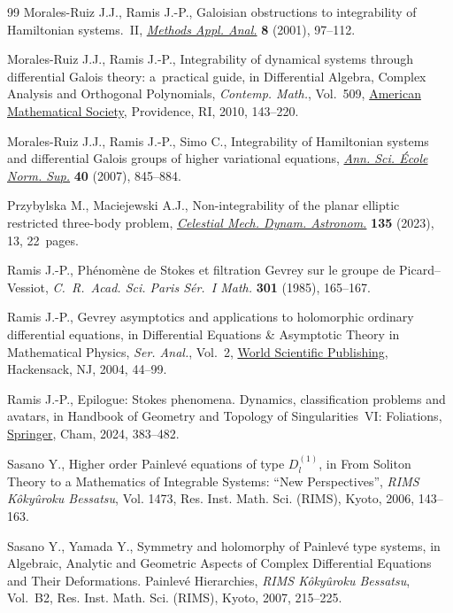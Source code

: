 \documentclass[pdftex]{sigma}
\numberwithin{equation}{section}
\begin{document}
\begin{thebibliography}{99}
Morales-Ruiz J.J., Ramis J.-P., Galoisian obstructions to integrability of
 {H}amiltonian systems.~{II}, \href{https://doi.org/10.4310/MAA.2001.v8.n1.a4}{\textit{Methods Appl. Anal.}} \textbf{8} (2001),
 97--112.

Morales-Ruiz J.J., Ramis J.-P., Integrability of dynamical systems through
 differential {G}alois theory: a~practical guide, in Differential Algebra,
 Complex Analysis and Orthogonal Polynomials, \textit{Contemp. Math.}, Vol.~509, \href{https://doi.org/10.1090/conm/509/09980}{American Mathematical Society}, Providence, RI, 2010, 143--220.

Morales-Ruiz J.J., Ramis J.-P., Simo C., Integrability of {H}amiltonian systems
 and differential {G}alois groups of higher variational equations,
 \href{https://doi.org/10.1016/j.ansens.2007.09.002}{\textit{Ann. Sci. \'{E}cole Norm. Sup.}} \textbf{40} (2007), 845--884.

Przybylska M., Maciejewski A.J., Non-integrability of the planar elliptic
 restricted three-body problem, \href{https://doi.org/10.1007/s10569-022-10120-5}{\textit{Celestial Mech. Dynam. Astronom.}}
 \textbf{135} (2023), 13, 22~pages.

Ramis J.-P., Ph\'enom\`ene de {S}tokes et filtration {G}evrey sur le groupe de
 {P}icard--{V}essiot, \textit{C.~R.~Acad. Sci. Paris S\'er.~{I} Math.}
 \textbf{301} (1985), 165--167.

Ramis J.-P., Gevrey asymptotics and applications to holomorphic ordinary
 differential equations, in Differential Equations \& Asymptotic Theory in
 Mathematical Physics, \textit{Ser. Anal.}, Vol.~2, \href{https://doi.org/10.1142/9789812702395_0002}{World Scientific
 Publishing}, Hackensack, NJ, 2004, 44--99.

Ramis J.-P., Epilogue: Stokes phenomena. Dynamics, classification problems and
 avatars, in Handbook of Geometry and Topology of Singularities~{VI}:
 Foliations, \href{https://doi.org/10.1007/978-3-031-54172-8_10}{Springer}, Cham, 2024, 383--482.

Sasano Y., Higher order {P}ainlev\'e equations of type {$D^{(1)}_l$}, in From
 Soliton Theory to a Mathematics of Integrable Systems: ``New Perspectives'',
 \textit{RIMS K\^oky\^uroku Bessatsu}, Vol. 1473, Res. Inst. Math. Sci.
 (RIMS), Kyoto, 2006, 143--163.

Sasano Y., Yamada Y., Symmetry and holomorphy of {P}ainlev\'e type systems, in
 Algebraic, Analytic and Geometric Aspects of Complex Differential Equations
 and Their Deformations. {P}ainlev\'e Hierarchies, \textit{RIMS K\^oky\^uroku
 Bessatsu}, Vol.~B2, Res. Inst. Math. Sci. (RIMS), Kyoto, 2007, 215--225.


\end{thebibliography}
\end{document}
